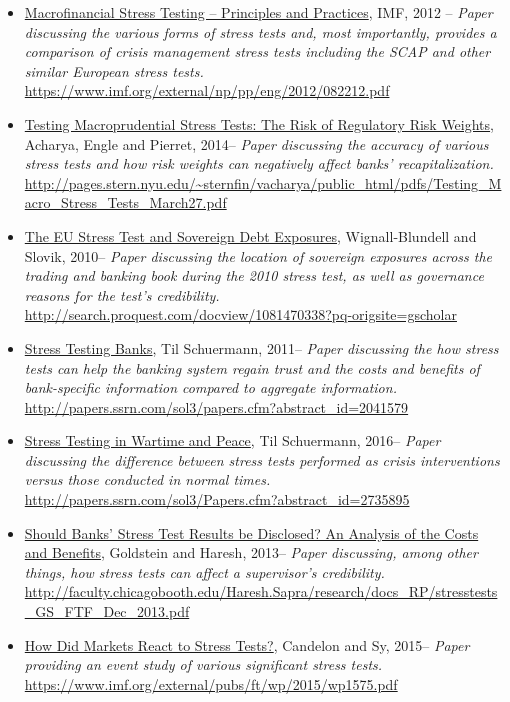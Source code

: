\documentclass[12pt]{article}
\begin{document}
\begin{itemize}
\item
\ul{Macrofinancial Stress Testing -- Principles and Practices},
 IMF, 2012 -- \emph{Paper discussing the various forms of stress tests and, most importantly, provides a comparison of crisis management stress tests including the SCAP and other similar European stress tests.} \url{https://www.imf.org/external/np/pp/eng/2012/082212.pdf}
\item
\ul{Testing Macroprudential Stress Tests: The Risk of Regulatory Risk Weights},
Acharya, Engle and Pierret, 2014-- \emph{Paper discussing the accuracy of various stress tests and how risk weights can negatively affect banks' recapitalization.} \url{http://pages.stern.nyu.edu/~sternfin/vacharya/public_html/pdfs/Testing_Macro_Stress_Tests_March27.pdf}
\item
\ul{The EU Stress Test and Sovereign Debt Exposures},
Wignall-Blundell and Slovik, 2010-- \emph{Paper discussing the location of sovereign exposures across the trading and banking book during the 2010 stress test, as well as governance reasons for the test's credibility.} \url{http://search.proquest.com/docview/1081470338?pq-origsite=gscholar}
\item
\ul{Stress Testing Banks},
Til Schuermann, 2011-- \emph{Paper discussing the how stress tests can help the banking system regain trust and the costs and benefits of bank-specific information compared to aggregate information.} \url{http://papers.ssrn.com/sol3/papers.cfm?abstract_id=2041579}
\item
\ul{Stress Testing in Wartime and Peace},
Til Schuermann, 2016-- \emph{Paper discussing the difference between stress tests performed as crisis interventions versus those conducted in normal times.} \url{http://papers.ssrn.com/sol3/Papers.cfm?abstract_id=2735895}
\item
\ul{Should Banks' Stress Test Results be Disclosed? An Analysis of the Costs and Benefits},
Goldstein and Haresh, 2013-- \emph{Paper discussing, among other things, how stress tests can affect a supervisor's credibility.} \url{http://faculty.chicagobooth.edu/Haresh.Sapra/research/docs_RP/stresstests_GS_FTF_Dec_2013.pdf}
\item
\ul{How Did Markets React to Stress Tests?},
Candelon and Sy, 2015-- \emph{Paper providing an event study of various significant stress tests.} \url{https://www.imf.org/external/pubs/ft/wp/2015/wp1575.pdf}

\end{itemize}
\end{document}
